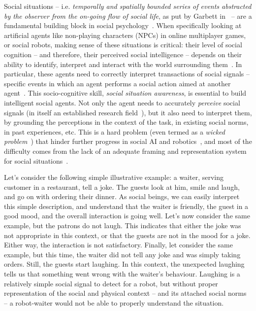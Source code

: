 Social situations -- i.e. \emph{temporally and spatially bounded series of
events abstracted by the observer from the on-going flow of social life}, as
put by Garbett in~\cite{garbett1970analysis} -- are a fundamental building
block in social psychology~\cite{argyle1981social}. When specifically looking
at artificial agents like non-playing characters (NPCs) in online multiplayer
games, or social robots, making sense of these situations is critical: their
level of social cognition -- and therefore, their perceived social intelligence
-- depends on their ability to identify, interpret and interact with the world
surrounding them~\cite{szczepanowski2017computational}. In particular, these
agents need to correctly interpret transactions of social signals -- specific
events in which an agent performs a social action aimed at another
agent~\cite{pantic2011social}. This socio-cognitive skill, \emph{social
situation awareness}, is essential to build intelligent social agents. Not only
the agent needs to accurately \emph{perceive} social signals (in itself an
established research field~\cite{pantic2011social,vinciarelli2009social}), but
it also need to interpret them, by grounding the perceptions in the context of
the task, in existing social norms, in past experiences, etc.  This is a hard
problem (even termed as a \emph{wicked problem}~\cite{west1967wicked})  that
hinder further progress in social AI and robotics~\cite{yang2018grand}, and
most of the difficulty comes from the lack of an adequate framing and
representation system for social situations~\cite{webb2021framing}.

Let's consider the following simple illustrative example: a waiter, serving
customer in a restaurant, tell a joke. The guests look at him, smile and laugh,
and go on with ordering their dinner. As social beings, we can easily interpret
this simple description, and understand that the waiter is friendly, the guest
in a good mood, and the overall interaction is going well. Let's now consider
the same example, but the patrons do not laugh. This indicates that either the
joke was not appropriate in this context, or that the guests are not in the mood
for a joke. Either way, the interaction is not satisfactory. Finally, let
consider the same example, but this time, the waiter did not tell any joke and
was simply taking orders. Still, the guests start laughing. In this context, the
unexpected laughing tells us that something went wrong with the waiter's
behaviour.  Laughing is a relatively simple social signal to detect for a robot,
but without proper representation of the social and physical context -- and its
attached social norms -- a robot-waiter would not be able to properly understand
the situation.

